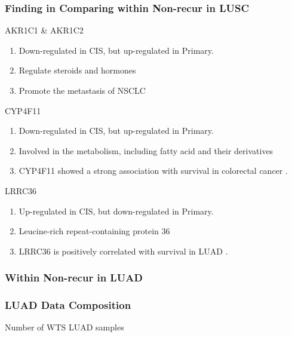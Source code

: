 \documentclass{beamer}
\begin{document}
    \begin{frame}[allowframebreaks]
        \frametitle{Finding in Comparing within Non-recur in LUSC}

        \begin{block}{AKR1C1 \& AKR1C2}
            \begin{enumerate}
                \item Down-regulated in CIS, but up-regulated in Primary.
                \item Regulate steroids \cite{AKR1C1-1} and hormones \cite{AKR1C1-2}
                \item Promote the metastasis of NSCLC \cite{AKR1C1-3}
            \end{enumerate}
        \end{block}

        \begin{block}{CYP4F11}
            \begin{enumerate}
                \item Down-regulated in CIS, but up-regulated in Primary.
                \item Involved in the metabolism, including fatty acid and their derivatives \cite{CYP4F11-1, CYP4F11-2, CYP4F11-3}
                \item CYP4F11 showed a strong association with survival in colorectal cancer \cite{CYP4F11-4}.
            \end{enumerate}
        \end{block}

        \begin{block}{LRRC36}
            \begin{enumerate}
                \item Up-regulated in CIS, but down-regulated in Primary.
                \item Leucine-rich repeat-containing protein 36
                \item LRRC36 is positively correlated with survival in LUAD \cite{LRRC36-1}.
            \end{enumerate}
        \end{block}
    \end{frame}

    \subsubsection{Within Non-recur in LUAD}
    \begin{frame}
        \frametitle{LUAD Data Composition}

        \begin{table}
            \caption{Number of WTS LUAD samples}
            
        \end{table}
    \end{frame}
\end{document}
